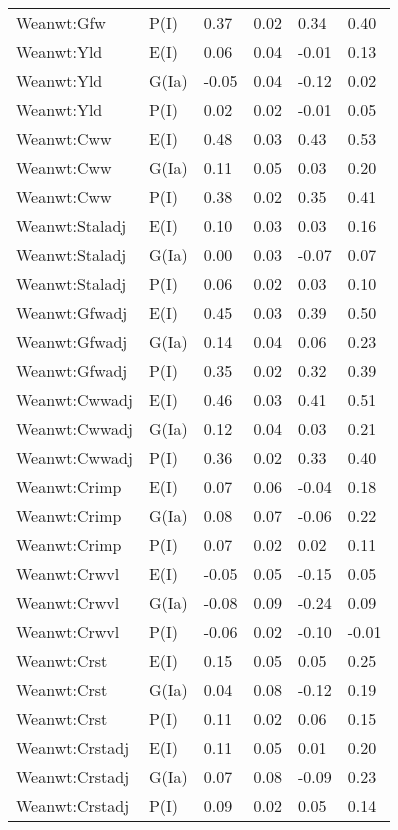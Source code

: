 \begin{center}
\begin{longtable}{|p{1.1in}|p{0.7in}|p{0.7in}|p{0.6in}|p{0.6in}|p{0.6in}|}
  Weanwt:Gfw & P(I) & 0.37 & 0.02 & 0.34 & 0.40 \\ 
  Weanwt:Yld & E(I) & 0.06 & 0.04 & -0.01 & 0.13 \\ 
  Weanwt:Yld & G(Ia) & -0.05 & 0.04 & -0.12 & 0.02 \\ 
  Weanwt:Yld & P(I) & 0.02 & 0.02 & -0.01 & 0.05 \\ 
  Weanwt:Cww & E(I) & 0.48 & 0.03 & 0.43 & 0.53 \\ 
  Weanwt:Cww & G(Ia) & 0.11 & 0.05 & 0.03 & 0.20 \\ 
  Weanwt:Cww & P(I) & 0.38 & 0.02 & 0.35 & 0.41 \\ 
  Weanwt:Staladj & E(I) & 0.10 & 0.03 & 0.03 & 0.16 \\ 
  Weanwt:Staladj & G(Ia) & 0.00 & 0.03 & -0.07 & 0.07 \\ 
  Weanwt:Staladj & P(I) & 0.06 & 0.02 & 0.03 & 0.10 \\ 
  Weanwt:Gfwadj & E(I) & 0.45 & 0.03 & 0.39 & 0.50 \\ 
  Weanwt:Gfwadj & G(Ia) & 0.14 & 0.04 & 0.06 & 0.23 \\ 
  Weanwt:Gfwadj & P(I) & 0.35 & 0.02 & 0.32 & 0.39 \\ 
  Weanwt:Cwwadj & E(I) & 0.46 & 0.03 & 0.41 & 0.51 \\ 
  Weanwt:Cwwadj & G(Ia) & 0.12 & 0.04 & 0.03 & 0.21 \\ 
  Weanwt:Cwwadj & P(I) & 0.36 & 0.02 & 0.33 & 0.40 \\ 
  Weanwt:Crimp & E(I) & 0.07 & 0.06 & -0.04 & 0.18 \\ 
  Weanwt:Crimp & G(Ia) & 0.08 & 0.07 & -0.06 & 0.22 \\ 
  Weanwt:Crimp & P(I) & 0.07 & 0.02 & 0.02 & 0.11 \\ 
  Weanwt:Crwvl & E(I) & -0.05 & 0.05 & -0.15 & 0.05 \\ 
  Weanwt:Crwvl & G(Ia) & -0.08 & 0.09 & -0.24 & 0.09 \\ 
  Weanwt:Crwvl & P(I) & -0.06 & 0.02 & -0.10 & -0.01 \\ 
  Weanwt:Crst & E(I) & 0.15 & 0.05 & 0.05 & 0.25 \\ 
  Weanwt:Crst & G(Ia) & 0.04 & 0.08 & -0.12 & 0.19 \\ 
  Weanwt:Crst & P(I) & 0.11 & 0.02 & 0.06 & 0.15 \\ 
  Weanwt:Crstadj & E(I) & 0.11 & 0.05 & 0.01 & 0.20 \\ 
  Weanwt:Crstadj & G(Ia) & 0.07 & 0.08 & -0.09 & 0.23 \\ 
  Weanwt:Crstadj & P(I) & 0.09 & 0.02 & 0.05 & 0.14 \\ 

\end{longtable}
\end{center}
